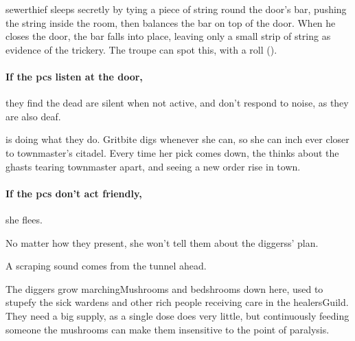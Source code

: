 \begin{multicols}{2}
\Gls{sewerthief} sleeps secretly by tying a piece of string round the door's bar, pushing the string inside the room, then balances the bar on top of the door.
When he closes the door, the bar falls into place, leaving only a small strip of string as evidence of the trickery.
The troupe can spot this, with a  roll (\tn[13]).

\paragraph{If the \glspl{pc} listen at the door,}
they find the dead are silent when not active, and don't respond to noise, as they are also deaf.%


\sewerthief


\begin{exampletext}
   is doing what they do.
  Gritbite digs whenever she can, so she can inch ever closer to \gls{townmaster}'s citadel.
  Every time her pick comes down, the thinks about the ghasts tearing \gls{townmaster} apart, and seeing a new order rise in \gls{town}.
\end{exampletext}

\paragraph{If the \glspl{pc} don't act friendly,}
she flees.

No matter how they present, she won't tell them about the \glspl{diggers}' plan.

\begin{boxtext}
  A scraping sound comes from the tunnel ahead.
\end{boxtext}



The \gls{diggers} grow \glspl{marchingMushroom} and \glspl{bedshroom} down here, used to stupefy the sick \glspl{warden} and other rich people receiving care in the \gls{healersGuild}.
They need a big supply, as a single dose does very little, but continuously feeding someone the mushrooms can make them insensitive to the point of paralysis.


\end{multicols}
